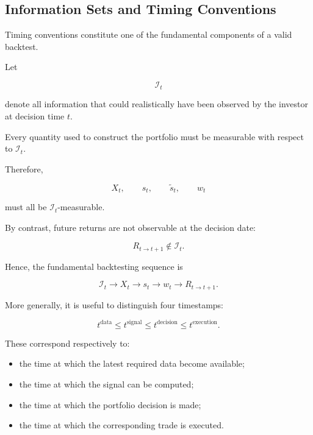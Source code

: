 \documentclass[11pt,a4paper]{article}
\begin{document}
\subsection{Information Sets and Timing Conventions}
\label{subsec:timing}

Timing conventions constitute one of the fundamental components of a valid
backtest.

Let

\begin{equation}
\mathcal{I}_t
\end{equation}

denote all information that could realistically have been observed by the
investor at decision time $t$.

Every quantity used to construct the portfolio must be measurable with respect
to $\mathcal{I}_t$.

Therefore,

\begin{equation}
X_t,
\qquad
s_t,
\qquad
\widetilde{s}_t,
\qquad
w_t
\end{equation}

must all be $\mathcal{I}_t$-measurable.

By contrast, future returns are not observable at the decision date:

\begin{equation}
R_{t\rightarrow t+1}
\notin
\mathcal{I}_t.
\end{equation}

Hence, the fundamental backtesting sequence is

\begin{equation}
\boxed{
\mathcal{I}_t
\longrightarrow
X_t
\longrightarrow
s_t
\longrightarrow
w_t
\longrightarrow
R_{t\rightarrow t+1}.
}
\end{equation}

More generally, it is useful to distinguish four timestamps:

\begin{equation}
t^{\mathrm{data}}
\leq
t^{\mathrm{signal}}
\leq
t^{\mathrm{decision}}
\leq
t^{\mathrm{execution}}.
\end{equation}

These correspond respectively to:

\begin{itemize}
    \item the time at which the latest required data become available;

    \item the time at which the signal can be computed;

    \item the time at which the portfolio decision is made;

    \item the time at which the corresponding trade is executed.
\end{itemize}
\end{document}
